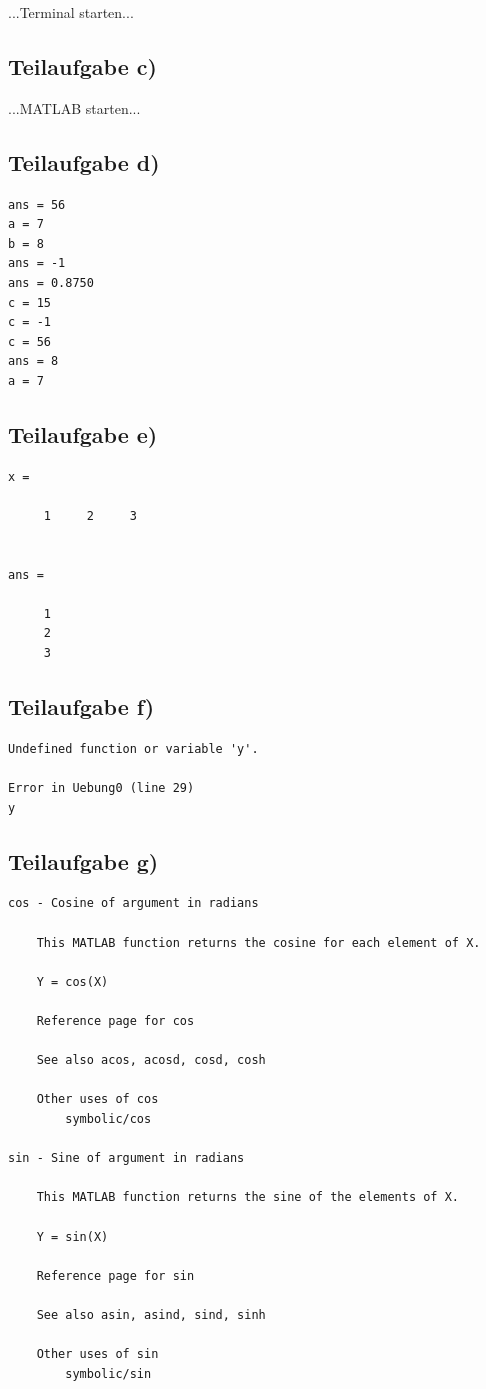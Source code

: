 \documentclass{llncs}
\begin{document}
...Terminal starten...

\subsection*{Teilaufgabe c)}

...MATLAB starten...

\subsection*{Teilaufgabe d)}

\begin{verbatim}
ans = 56
a = 7
b = 8
ans = -1
ans = 0.8750
c = 15
c = -1
c = 56
ans = 8
a = 7
\end{verbatim}


\subsection*{Teilaufgabe e)}

\begin{verbatim}
x =

     1     2     3


ans =

     1
     2
     3
\end{verbatim}


\subsection*{Teilaufgabe f)}

\begin{verbatim}
Undefined function or variable 'y'.

Error in Uebung0 (line 29)
y
\end{verbatim}


\subsection*{Teilaufgabe g)}

\begin{verbatim}
cos - Cosine of argument in radians

    This MATLAB function returns the cosine for each element of X.

    Y = cos(X)

    Reference page for cos

    See also acos, acosd, cosd, cosh

    Other uses of cos
        symbolic/cos

sin - Sine of argument in radians

    This MATLAB function returns the sine of the elements of X.

    Y = sin(X)

    Reference page for sin

    See also asin, asind, sind, sinh

    Other uses of sin
        symbolic/sin
\end{verbatim}
\end{document}

